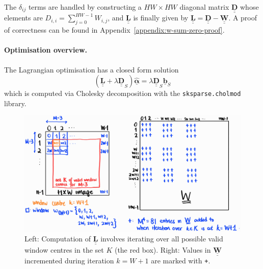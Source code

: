 \documentclass{article}
\theoremstyle{definition}
\def\vt#1{\underline{\mathbf{#1}}}
\def\vts#1{\underline{\boldsymbol{#1}}}
\def\mt#1{\underline{\underline{\mathbf{#1}}}}
\begin{document}
\begin{multicols}{2}[]


The $\delta_{ij}$ terms are handled by constructing a $HW\times HW$ diagonal matrix $\mt D$ whose elements are $D_{i,i} = \sum_{j=0}^{HW-1} W_{i,j}$, and $\mt L$ is finally given by $\mt L = \mt D - \mt W$. A proof of correctness can be found in Appendix~\ref{appendix:w-sum-zero-proof}.

\paragraph{Optimisation overview.}
The Lagrangian optimisation has a closed form solution
$$\left(\mt L + \lambda \mt D_S\right) \hat{\vts \alpha} = \lambda \mt D_S \vt b_S$$
which is computed via Cholesky decomposition with the \verb|sksparse.cholmod| library.

\begin{figure}[H]
    \centering
    \includegraphics[width=\columnwidth]{index-displacement}
    \caption{Left: Computation of $\mt L$ involves iterating over all possible valid window centres in the set $K$ (the red box). Right: Values in $\mt W$ incremented during iteration $k=W+1$ are marked with \texttt{+}.}
    \label{fig:index-displacement}
\end{figure}





\end{multicols}
\end{document}
